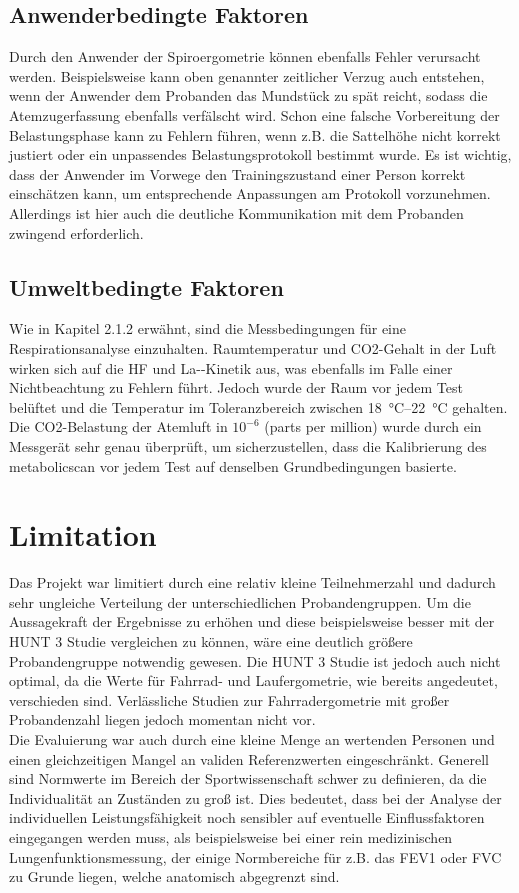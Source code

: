 \subsection{Anwenderbedingte Faktoren}
%
Durch den Anwender der Spiroergometrie können ebenfalls Fehler verursacht werden. Beispielsweise kann oben genannter zeitlicher Verzug auch entstehen, wenn der Anwender dem Probanden das Mundstück zu spät reicht, sodass die Atemzugerfassung ebenfalls verfälscht wird. Schon eine falsche Vorbereitung der Belastungsphase kann zu Fehlern führen, wenn z.B. die Sattelhöhe nicht korrekt justiert oder ein unpassendes Belastungsprotokoll bestimmt wurde. Es ist wichtig, dass der Anwender im Vorwege den Trainingszustand einer Person korrekt einschätzen kann, um entsprechende Anpassungen am Protokoll vorzunehmen. Allerdings ist hier auch die deutliche Kommunikation mit dem Probanden zwingend erforderlich.
%
\subsection{Umweltbedingte Faktoren}
%
Wie in Kapitel 2.1.2 erwähnt, sind die Messbedingungen für eine Respirationsanalyse einzuhalten. Raumtemperatur und \acs{CO2}-Gehalt in der Luft wirken sich auf die \acs{HF} und \acs{La-}-Kinetik aus, was ebenfalls im Falle einer Nichtbeachtung zu Fehlern führt. Jedoch wurde der Raum vor jedem Test belüftet und die Temperatur im Toleranzbereich zwischen \SIrange{18}{22}{\degreeCelsius} gehalten. Die \acs{CO2}-Belastung der Atemluft in $10^{-6}$ (parts per million) wurde durch ein Messgerät sehr genau überprüft, um sicherzustellen, dass die Kalibrierung des metabolicscan vor jedem Test auf denselben Grundbedingungen basierte.
%
\section{Limitation}
%
Das Projekt war limitiert durch eine relativ kleine Teilnehmerzahl und dadurch sehr ungleiche Verteilung der unterschiedlichen Probandengruppen. Um die Aussagekraft der Ergebnisse zu erhöhen und diese beispielsweise besser mit der HUNT 3 Studie vergleichen zu können, wäre eine deutlich größere Probandengruppe notwendig gewesen. Die HUNT 3 Studie ist jedoch auch nicht optimal, da die Werte für Fahrrad- und Laufergometrie, wie bereits angedeutet, verschieden sind. Verlässliche Studien zur Fahrradergometrie mit großer Probandenzahl liegen jedoch momentan nicht vor.\\
Die Evaluierung war auch durch eine kleine Menge an wertenden Personen und einen gleichzeitigen Mangel an validen Referenzwerten eingeschränkt. Generell sind Normwerte im Bereich der Sportwissenschaft schwer zu definieren, da die Individualität an Zuständen zu groß ist. Dies bedeutet, dass bei der Analyse der individuellen Leistungsfähigkeit noch sensibler auf eventuelle Einflussfaktoren eingegangen werden muss, als beispielsweise bei einer rein medizinischen Lungenfunktionsmessung, der einige Normbereiche für z.B. das \ac{FEV1} oder \ac{FVC} zu Grunde liegen, welche anatomisch abgegrenzt sind.
%
